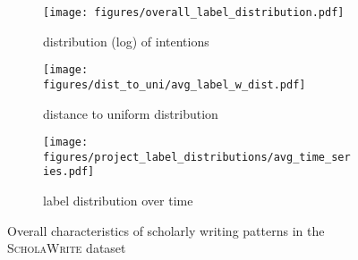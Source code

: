 \begin{figure*}[ht]
    \begin{subfigure}[b]{0.34\textwidth}
        \centering
        \texttt{[image: figures/overall\_label\_distribution.pdf]}
        \vspace{-2em}
        \caption{distribution (log) of intentions}
        \label{fig:intention-dist}
    \end{subfigure}
    \hspace{0.1em}
    \begin{subfigure}[b]{0.30\textwidth}
        \centering
        \texttt{[image: figures/dist\_to\_uni/avg\_label\_w\_dist.pdf]}
        \vspace{-2em}
        \caption{distance to uniform distribution}
        \label{fig:avg_dist_uni}
    \end{subfigure}
    \hspace{0.1em}
    \begin{subfigure}[b]{0.33\textwidth}
        \centering
        \texttt{[image: figures/project\_label\_distributions/avg\_time\_series.pdf]}
        \vspace{-2em}
        \caption{label distribution over time}
        \label{fig:avg-time-label}
    \end{subfigure}
    \caption{Overall characteristics of scholarly writing patterns in the \textsc{ScholaWrite} dataset
    }
    \label{fig:sec4-results}
\end{figure*}

